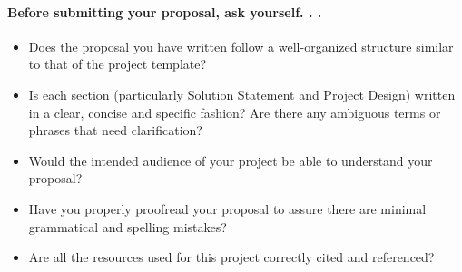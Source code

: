 \paragraph{
  \textbf{Before submitting your proposal, ask yourself. . .}
}
\begin{itemize}
\item Does the proposal you have written follow a well-organized structure similar to that of the project template? 
\item Is each section (particularly Solution Statement and Project Design) written in a clear, concise and specific fashion? Are there any ambiguous terms or phrases that need clarification? 
\item Would the intended audience of your project be able to understand your proposal? 
\item Have you properly proofread your proposal to assure there are minimal grammatical and spelling mistakes? 
\item Are all the resources used for this project correctly cited and referenced? 
\end{itemize}